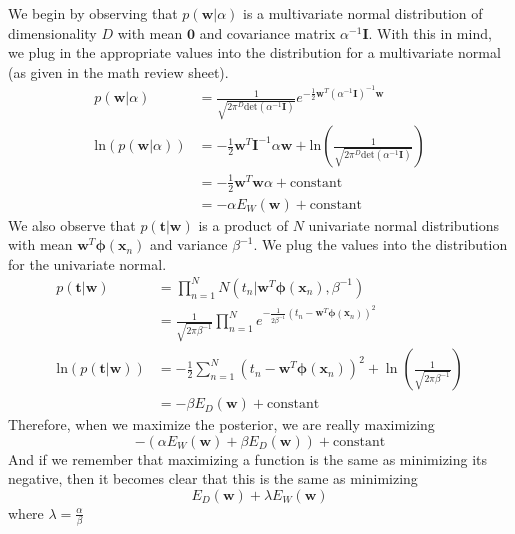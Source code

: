 \documentclass[submit]{harvardml}
\begin{document}
We begin by observing that $p(\textbf{w}|\alpha)$ is a multivariate normal distribution of dimensionality $D$ with mean $\textbf{0}$ and covariance matrix $\alpha^{-1}\textbf{I}$. With this in mind, we plug in the appropriate values into the distribution for a multivariate normal (as given in the math review sheet).
	\begin{align*}
		p(\textbf{w}|\alpha) &= \frac{1}{\sqrt{2\pi^D\text{det}(\alpha^{-1}\textbf{I})}}e^{-\frac{1}{2}\textbf{w}^T(\alpha^{-1}\textbf{I})^{-1}{\textbf{w}}} \\
		\text{ln}(p(\textbf{w}|\alpha)) &= -\frac{1}{2}\textbf{w}^T\textbf{I}^{-1}\alpha\textbf{w} + \text{ln}\left(\frac{1}{\sqrt{2\pi^D\text{det}(\alpha^{-1}\textbf{I})}}\right)\\
		&= -\frac{1}{2}\textbf{w}^T\textbf{w}\alpha + \text{constant} \\ 
		&= -\alpha E_W(\textbf{w}) + \text{constant}
	\end{align*}
We also observe that $p(\textbf{t}|\textbf{w})$ is a product of $N$ univariate normal distributions with mean $\textbf{w}^T\boldsymbol{\phi}(\textbf{x}_n)$ and variance $\beta^{-1}$. We plug the values into the distribution for the univariate normal.
	\begin{align*}
		p(\boldsymbol{t}|\boldsymbol{w}) &= \prod^N_{n=1} N(t_n | \textbf{w}^T\boldsymbol{\phi}(\textbf{x}_n), \beta^{-1}) \\
		&= \frac{1}{\sqrt{2\pi\beta^{-1}}}\prod^N_{n=1}  e^{-\frac{1}{2\beta^{-1}} (t_n - \textbf{w}^T\boldsymbol{\phi}(\textbf{x}_n))^2}\\
		\text{ln}(p(\boldsymbol{t}|\boldsymbol{w})) &= -\frac{1}{2}\sum^N_{n=1} (t_n - \textbf{w}^T\boldsymbol{\phi}(\textbf{x}_n))^2 + \ln\left( \frac{1}{\sqrt{2\pi\beta^{-1}}} \right)\\
		&= - \beta E_D(\textbf{w}) + \text{constant} 
	\end{align*}
Therefore, when we maximize the posterior, we are really maximizing
	$$-(\alpha E_W(\textbf{w}) + \beta E_D(\textbf{w})) + \text{constant}$$
And if we remember that maximizing a function is the same as minimizing its negative, then it becomes clear that  this is the same as minimizing 
	$$E_D(\textbf{w}) + \lambda E_W(\textbf{w})$$
where $\lambda  = \frac{\alpha}{\beta}$	
\end{document}
